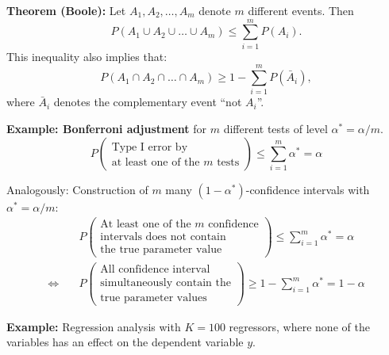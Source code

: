 \documentclass[
]{book}
\begin{document}
\textbf{Theorem (Boole):} Let \(A_1, A_2, \dots, A_m\) denote \(m\) different events. Then
\[
 P(A_1 \cup A_2 \cup \dots \cup A_m) \leq \sum_{i=1}^m P(A_i).
\]
This inequality also implies that:
\[
 P(A_1 \cap A_2 \cap \dots \cap A_m) \ge
  1 - \sum_{i=1}^m P(\bar A_i),
\]
where \(\bar A_i\) denotes the complementary event ``not \(A_i\)''.

\hfill\break

\textbf{Example: Bonferroni adjustment} for \(m\) different tests of level \(\alpha^* = \alpha/m\).
\[
P\begin{pmatrix}
\text{Type I error by} \\
\text{at least one of the $m$ tests}
\end{pmatrix}
\leq \sum_{i=1}^m \alpha^\ast = \alpha
\]

\hfill\break

Analogously: Construction of \(m\) many \((1-\alpha^*)\)-confidence intervals with \(\alpha^* =\alpha/m\):
\begin{align*}
&P\begin{pmatrix}
      \text{At least one of the $m$ confidence} \\
      \text{intervals does not contain} \\
      \text{the true parameter value} 
  \end{pmatrix}
\leq \sum_{i=1}^m \alpha^\ast = \alpha\\[2ex]
\Leftrightarrow\quad
&P\begin{pmatrix}
    \text{All confidence interval} \\
    \text{simultaneously contain the} \\
    \text{true parameter values}
  \end{pmatrix}
\geq 1 - \sum_{i=1}^m \alpha^\ast = 1 - \alpha
\end{align*}

\textbf{Example:}
Regression analysis with \(K=100\) regressors, where none of the variables has an effect on the dependent variable \(y\).
\end{document}
